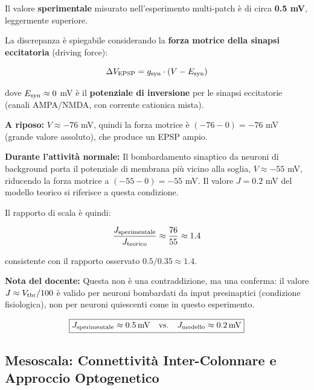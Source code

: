 Il valore \textbf{sperimentale} misurato nell'esperimento multi-patch è di circa \textbf{0.5 mV}, leggermente superiore.


La discrepanza è spiegabile considerando la \textbf{forza motrice della sinapsi eccitatoria} (driving force):

\begin{equation}
\Delta V_{\rm EPSP} = g_{\rm syn} \cdot (V - E_{\rm syn})
\end{equation}

dove $E_{\rm syn} \approx 0$ mV è il \textbf{potenziale di inversione} per le sinapsi eccitatorie (canali AMPA/NMDA, con corrente cationica mista).

\textbf{A riposo:} $V \approx -76$ mV, quindi la forza motrice è $(-76 - 0) = -76$ mV (grande valore assoluto), che produce un EPSP ampio.

\textbf{Durante l'attività normale:} Il bombardamento sinaptico da neuroni di background porta il potenziale di membrana più vicino alla soglia, $V \approx -55$ mV, riducendo la forza motrice a $(-55 - 0) = -55$ mV. Il valore $J = 0.2$ mV del modello teorico si riferisce a questa condizione.

Il rapporto di scala è quindi:

\begin{equation}
\frac{J_{\rm sperimentale}}{J_{\rm teorico}} \approx \frac{76}{55} \approx 1.4
\end{equation}

consistente con il rapporto osservato $0.5/0.35 \approx 1.4$.

\begin{tcolorbox}[colback=gray!5, colframe=gray!40, arc=2mm, boxrule=0.5pt]
\textbf{Nota del docente:} Questa non è una contraddizione, ma una conferma: il valore $J \approx V_{\rm thr}/100$ è valido per neuroni bombardati da input presinaptici (condizione fisiologica), non per neuroni quiescenti come in questo esperimento.
\end{tcolorbox}

\begin{equation}
\boxed{J_{\rm sperimentale} \approx 0.5\,\text{mV} \quad \text{vs.} \quad J_{\rm modello} \approx 0.2\,\text{mV}}
\end{equation}


\subsection{Mesoscala: Connettività Inter-Colonnare e Approccio Optogenetico}

